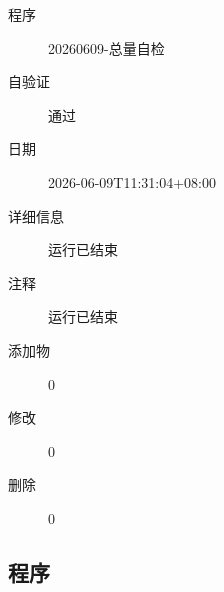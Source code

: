 \documentclass[UTF8,10pt,a4paper,fontset=fandol]{ctexart}
\newcommand{\fieldvalue}[1]{#1}
\begin{document}
\begin{description}
    \item[程序]%
    \fieldvalue{20260609-总量自检}

    \item[自验证]%
    \fieldvalue{通过}

    \item[日期]%
    \fieldvalue{2026-06-09T11:31:04+08:00}

    \item[详细信息]%
    \fieldvalue{运行已结束}

    \item[注释]%
    \fieldvalue{运行已结束}

    \item[添加物]%
    \fieldvalue{0}

    \item[修改]%
    \fieldvalue{0}

    \item[删除]%
    \fieldvalue{0}
\end{description}

\subsection*{程序}
\end{document}

